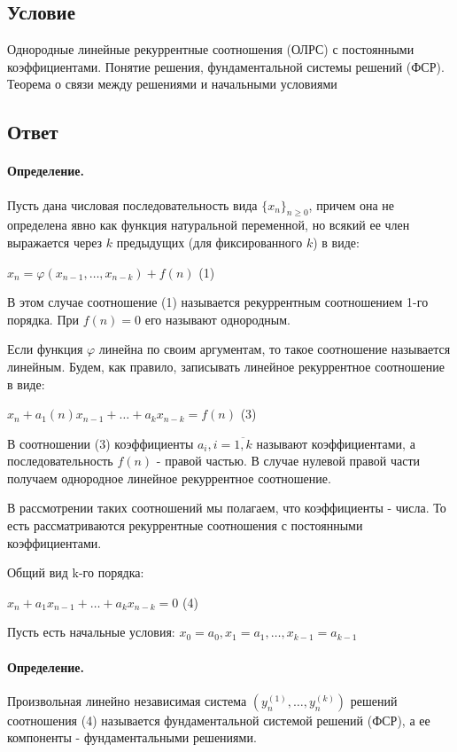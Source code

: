 \documentclass{report}
\begin{document}
\subsection{Условие}
Однородные линейные рекуррентные соотношения (ОЛРС) с постоянными
коэффициентами. Понятие решения, фундаментальной системы решений (ФСР).
Теорема о связи между решениями и начальными условиями

\subsection{Ответ}

\paragraph*{Определение.}
Пусть дана числовая последовательность вида $\{x_{n}\}_{n\ge 0} $,
причем она не определена явно как функция натуральной переменной, но всякий
ее член выражается через $k$ предыдущих (для фиксированного $k$) в виде:

 $x_{n} = \varphi(x_{n-1},\ldots,x_{n-k}) + f(n)$ (1)

 В этом случае соотношение (1) называется рекуррентным соотношением 1-го порядка. При
 $f(n) = 0$ его называют однородным.

 Если функция  $\varphi$ линейна по своим аргументам, то такое соотношение называется
 линейным. Будем, как правило, записывать линейное рекуррентное соотношение в виде:

  $x_{n} +a_1(n)x_{n-1}+\ldots+a_{k}x_{n-k} = f(n)$ (3)

\medskip

В соотношении (3) коэффициенты $a_{i}, i = \overline{1,k}$ называют коэффициентами,
а последовательность $f(n)$ - правой частью. В случае нулевой правой части получаем
однородное линейное рекуррентное соотношение.

В рассмотрении таких соотношений мы полагаем, что коэффициенты - числа. То есть рассматриваются
рекуррентные соотношения с постоянными коэффициентами.

\medskip

Общий вид k-го порядка:

$x_{n}+a_1x_{n-1}+\ldots+a_{k}x_{n-k} = 0$ (4)

Пусть есть начальные условия:
$x_0=a_0, x_1=a_1,\ldots,x_{k-1}=a_{k-1}$

\paragraph*{Определение.}
Произвольная линейно независимая система $(y^{(1)}_{n},\ldots,y^{(k)}_{n})$ решений
соотношения (4) называется фундаментальной системой решений (ФСР), а ее компоненты -
фундаментальными решениями.
\end{document}
